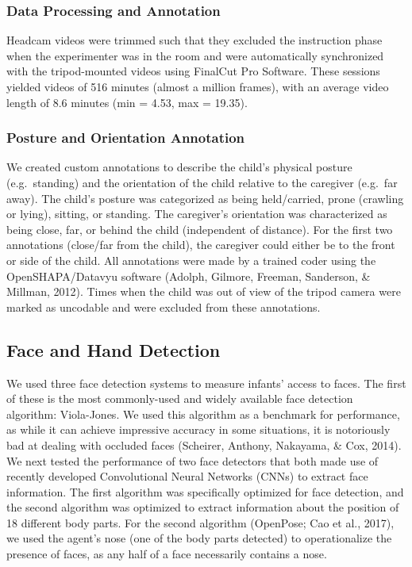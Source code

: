 \documentclass[10pt, letterpaper]{article}
\begin{document}
\subsubsection{Data Processing and
Annotation}\label{data-processing-and-annotation}

Headcam videos were trimmed such that they excluded the instruction
phase when the experimenter was in the room and were automatically
synchronized with the tripod-mounted videos using FinalCut Pro Software.
These sessions yielded videos of 516 minutes (almost a million frames),
with an average video length of 8.6 minutes (min = 4.53, max = 19.35).

\subsubsection{Posture and Orientation
Annotation}\label{posture-and-orientation-annotation}

We created custom annotations to describe the child's physical posture
(e.g.~standing) and the orientation of the child relative to the
caregiver (e.g.~far away). The child's posture was categorized as being
held/carried, prone (crawling or lying), sitting, or standing. The
caregiver's orientation was characterized as being close, far, or behind
the child (independent of distance). For the first two annotations
(close/far from the child), the caregiver could either be to the front
or side of the child. All annotations were made by a trained coder using
the OpenSHAPA/Datavyu software (Adolph, Gilmore, Freeman, Sanderson, \&
Millman, 2012). Times when the child was out of view of the tripod
camera were marked as uncodable and were excluded from these
annotations.

\subsection{Face and Hand Detection}\label{face-and-hand-detection}

We used three face detection systems to measure infants' access to
faces. The first of these is the most commonly-used and widely available
face detection algorithm: Viola-Jones. We used this algorithm as a
benchmark for performance, as while it can achieve impressive accuracy
in some situations, it is notoriously bad at dealing with occluded faces
(Scheirer, Anthony, Nakayama, \& Cox, 2014). We next tested the
performance of two face detectors that both made use of recently
developed Convolutional Neural Networks (CNNs) to extract face
information. The first algorithm was specifically optimized for face
detection, and the second algorithm was optimized to extract information
about the position of 18 different body parts. For the second algorithm
(OpenPose; Cao et al., 2017), we used the agent's nose (one of the body
parts detected) to operationalize the presence of faces, as any half of
a face necessarily contains a nose.
\end{document}
